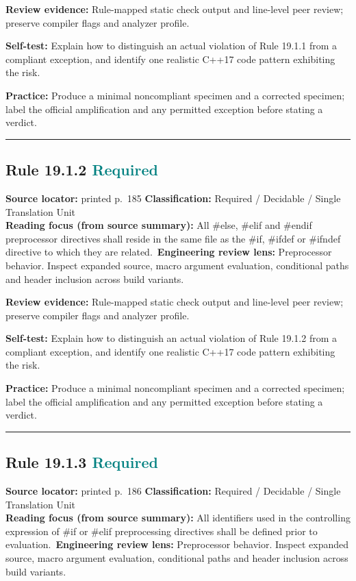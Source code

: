 \documentclass[10pt,letterpaper]{article}
\begin{document}
\textbf{Review evidence:} Rule-mapped static check output and line-level peer review; preserve compiler flags and analyzer profile.

\textbf{Self-test:} Explain how to distinguish an actual violation of Rule 19.1.1 from a compliant exception, and identify one realistic C++17 code pattern exhibiting the risk.\par
\textbf{Practice:} Produce a minimal noncompliant specimen and a corrected specimen; label the official amplification and any permitted exception before stating a verdict.
\smallskip\hrule\smallskip
\subsection*{Rule 19.1.2 \enspace \texorpdfstring{\small\textcolor{teal}{Required}}{Required}}
\noindent\textbf{Source locator:} printed p.~185 \quad\textbf{Classification:} Required / Decidable / Single Translation Unit\\
\textbf{Reading focus (from source summary):} All \#else, \#elif and \#endif preprocessor directives shall reside in the same file as the \#if, \#ifdef or \#ifndef directive to which they are related.\
\textbf{Engineering review lens:} Preprocessor behavior. Inspect expanded source, macro argument evaluation, conditional paths and header inclusion across build variants.

\textbf{Review evidence:} Rule-mapped static check output and line-level peer review; preserve compiler flags and analyzer profile.

\textbf{Self-test:} Explain how to distinguish an actual violation of Rule 19.1.2 from a compliant exception, and identify one realistic C++17 code pattern exhibiting the risk.\par
\textbf{Practice:} Produce a minimal noncompliant specimen and a corrected specimen; label the official amplification and any permitted exception before stating a verdict.
\smallskip\hrule\smallskip
\subsection*{Rule 19.1.3 \enspace \texorpdfstring{\small\textcolor{teal}{Required}}{Required}}
\noindent\textbf{Source locator:} printed p.~186 \quad\textbf{Classification:} Required / Decidable / Single Translation Unit\\
\textbf{Reading focus (from source summary):} All identifiers used in the controlling expression of \#if or \#elif preprocessing directives shall be defined prior to evaluation.\
\textbf{Engineering review lens:} Preprocessor behavior. Inspect expanded source, macro argument evaluation, conditional paths and header inclusion across build variants.
\end{document}
